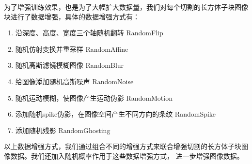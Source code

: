 为了增强训练效果，也是为了大幅扩大数据量，我们对每个切割的长方体子块图像块进行了数据增强，具体的数据增强方式有：
\begin{enumerate}\label{enum:data_augmentation}
    \item {沿深度、高度、宽度三个轴随机翻转 RandomFlip}
    \item {随机仿射变换并重采样 RandomAffine}
    \item {随机高斯滤镜模糊图像 RandomBlur}
    \item {给图像添加随机高斯噪声 RandomNoise}
    \item {随机运动模糊，使图像产生运动伪影 RandomMotion}
    \item {添加随机spike伪影，在图像空间产生不同方向的条纹 RandomSpike}
    \item {添加随机残影 RandomGhosting}
\end{enumerate}
以上数据增强方式，我们通过组合不同的增强方式来联合增强切割的长方体子块图像数据。我们还加入随机概率作用于这些数据增强方式，
进一步增强图像数据。


